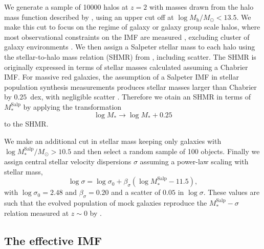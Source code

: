 \documentclass[usenatbib]{mnras}
\def\mhalo{M_{\mathrm{h}}}
\def\msalp{M_*^{\mathrm{Salp}}}
\def\Sref#1{Section~\ref{#1}\xspace}
\begin{document}
We generate a sample of 10000 halos at $z=2$ with masses drawn from the
  halo mass function described by \citet{Tin++08}, using an upper cut
  off at $\log{\mhalo/M_\odot} < 13.5$.  We make this cut to focus on
the regime of galaxy or galaxy group scale halos, where most
observational constraints on the IMF are measured \citep{Gav++07},
excluding cluster of galaxy environments \citep[though IMF constraints
  are available for some brightest cluster galaxies;][]{New++13}.  We
then assign a Salpeter stellar mass to each halo using the
stellar-to-halo mass relation (SHMR) from \citet{Lea++12}, including
scatter. 
The \citet{Lea++12} SHMR is originally expressed in terms of stellar masses calculated assuming a Chabrier IMF. %
For massive red galaxies, the assumption of a Salpeter IMF in stellar population synthesis measurements produces stellar masses larger than Chabrier by $0.25$~dex, with negligible scatter \citep{Aug++10}. 
Therefore we otain an SHMR in terms of $\msalp$ by applying the transformation
\begin{equation}
\log{M_*} \rightarrow \log{M_*} + 0.25
\end{equation}
to the \citet{Lea++12} SHMR.

We make an additional cut in stellar mass keeping only
galaxies with $\log{\msalp/M_\odot} > 10.5$ and then select a random sample of
100 objects.  Finally we assign central stellar velocity dispersions
$\sigma$ assuming a power-law scaling with stellar mass,
\begin{equation}\label{eq:mason}
\log{\sigma} = \log{\sigma_0} + \beta_\sigma(\log{\msalp} - 11.5), 
\end{equation}
with $\log{\sigma_0}=2.48$ and $\beta_\sigma=0.20$ and a scatter of
$0.05$ in $\log{\sigma}$. These values are such that the evolved
  population of mock galaxies reproduce the $\msalp-\sigma$ relation
  measured at $z\sim0$ by \citet[][see
    \Sref{ssec:drymerger}]{Aug++10}.

\subsection{The effective IMF}
\label{ssect:imfform}
\end{document}
